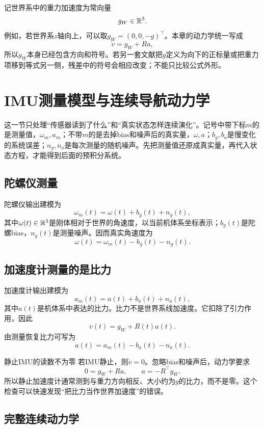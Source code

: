 记世界系中的重力加速度为常向量
\[
    g_W\in\mathbb{R}^3.
\]
例如，若世界系$z$轴向上，可以取$g_W=(0,0,-g)^\top$。本章的动力学统一写成
\[
    \dot v=g_W+Ra,
\]
所以$g_W$本身已经包含方向和符号。若另一套文献把$g$定义为向下的正标量或把重力项移到等式另一侧，残差中的符号会相应改变；不能只比较公式外形。


\section{IMU测量模型与连续导航动力学}

这一节只处理“传感器读到了什么”和“真实状态怎样连续演化”。记号中带下标$m$的是测量值，$\omega_m,a_m$；不带$m$的是去掉bias和噪声后的真实量，$\omega,a$；$b_g,b_a$是慢变化的系统误差；$n_g,n_a$是每次测量的随机噪声。先把测量值还原成真实量，再代入状态方程，才能得到后面的预积分系统。

\subsection{陀螺仪测量}

陀螺仪输出建模为
\[
    \omega_m(t)
    =\omega(t)+b_g(t)+n_g(t),
\]
其中$\omega(t)\in\mathbb{R}^3$是刚体相对于世界的角速度，以当前机体系坐标表示；$b_g(t)$是陀螺bias，$n_g(t)$是测量噪声。因而真实角速度为
\[
    \omega(t)=\omega_m(t)-b_g(t)-n_g(t).
\]

\subsection{加速度计测量的是比力}

加速度计输出建模为
\[
    a_m(t)=a(t)+b_a(t)+n_a(t),
\]
其中$a(t)$是机体系中表达的比力。比力不是世界系线加速度。它扣除了引力作用，因此
\[
    \dot v(t)=g_W+R(t)a(t).
\]
由测量恢复比力可写为
\[
    a(t)=a_m(t)-b_a(t)-n_a(t).
\]

\begin{imucase}{静止IMU的读数不为零}
若IMU静止，则$\dot v=0$。忽略bias和噪声后，动力学要求
\[
    0=g_W+Ra,
    \qquad
    a=-R^\top g_W.
\]
所以静止加速度计通常测到与重力方向相反、大小约为$g$的比力，而不是零。这个检查可以快速发现“把比力当作世界加速度”的错误。
\end{imucase}

\subsection{完整连续动力学}

